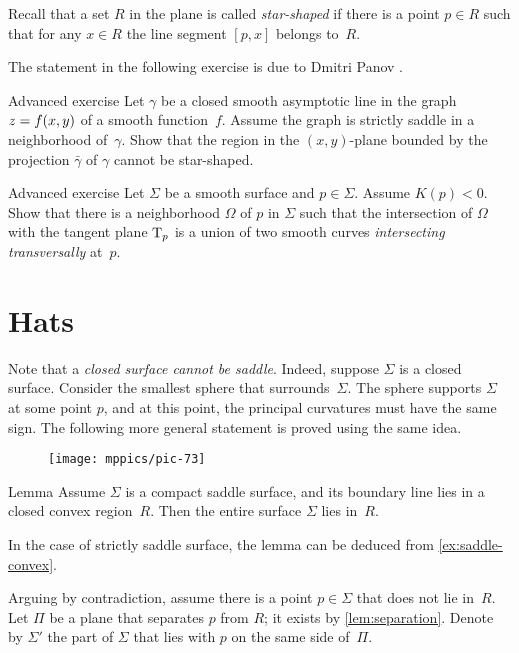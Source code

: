 Recall that a set $R$ in the plane is called \emph{star-shaped} if there is a point $p\in R$ such that for any $x\in R$ the line segment $[p,x]$ belongs to~$R$.

The statement in the following exercise is due to Dmitri Panov \cite{panov-curves}.

\begin{thm}{Advanced exercise}\label{ex:panov}
Let $\gamma$ be a closed smooth asymptotic line
in the graph $z\z=f(x,y)$ of a smooth function~$f$. 
Assume the graph is strictly saddle in a neighborhood of~$\gamma$.
Show that the region in the $(x,y)$-plane bounded by the projection $\bar \gamma$ of $\gamma$ cannot be star-shaped. 
\end{thm}

\begin{thm}{Advanced exercise}\label{ex:crosss}
Let $\Sigma$ be a smooth surface and $p\in \Sigma$.
Assume $K(p)<0$.
Show that there is a neighborhood $\Omega$ of $p$ in $\Sigma$
such that the intersection of $\Omega$ with the tangent plane $\mathrm{T}_p$ is a union of two smooth curves  \emph{intersecting transversally} at~$p$.
\end{thm}


\section{Hats}

Note that a \emph{closed surface cannot be saddle}.
Indeed, suppose $\Sigma$ is a closed surface.
Consider the smallest sphere that surrounds~$\Sigma$.
The sphere supports $\Sigma$ at some point $p$, and at this point, the principal curvatures must have the same sign.
The following more general statement is proved using the same idea.

{

\begin{wrapfigure}[10]{r}{45 mm}
\vskip-0mm
\centering
\texttt{[image: mppics/pic-73]}
\vskip0mm
\end{wrapfigure}

\begin{thm}{Lemma}\label{lem:convex-saddle}
Assume $\Sigma$ is a compact saddle surface, and its boundary line lies in a closed convex  region~$R$.
Then the entire surface $\Sigma$ lies in~$R$.
\end{thm}

In the case of strictly saddle surface, the lemma can be deduced from \ref{ex:saddle-convex}.

Arguing by contradiction,
assume there is a point $p\in \Sigma$ that does not lie in~$R$.
Let $\Pi$ be a plane that separates $p$ from $R$; it exists by \ref{lem:separation}.
Denote by $\Sigma'$ the part of $\Sigma$ that lies with $p$ on the same side of~$\Pi$.

}

